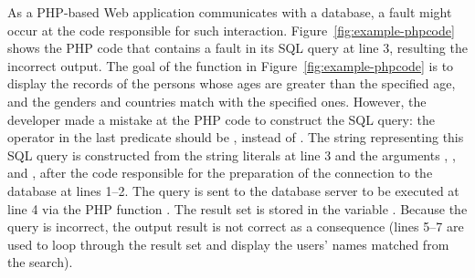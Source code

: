 As a PHP-based Web application communicates with a database, a fault
might occur at the code responsible for such
interaction. Figure~\ref{fig:example-phpcode} shows the PHP code that
contains a fault in its SQL query at line 3, resulting the incorrect
output. The goal of the function in Figure~\ref{fig:example-phpcode}
is to display the records of the persons whose ages are greater than
the specified age, and the genders and countries match with the
specified ones. However, the developer made a mistake at the PHP code
to construct the SQL query: the operator in the last predicate
 should be , instead of
. The string representing this SQL query is constructed
from the string literals at line 3 and the arguments ,
, and , after the code responsible for the
preparation of the connection to the database at lines 1--2. The query
is sent to the database server to be executed at line 4 via the PHP
function . The result set is stored in the variable
. Because the query is incorrect, the output result is
not correct as a consequence (lines 5--7 are used to loop through the
result set and display the users' names matched from the search).


